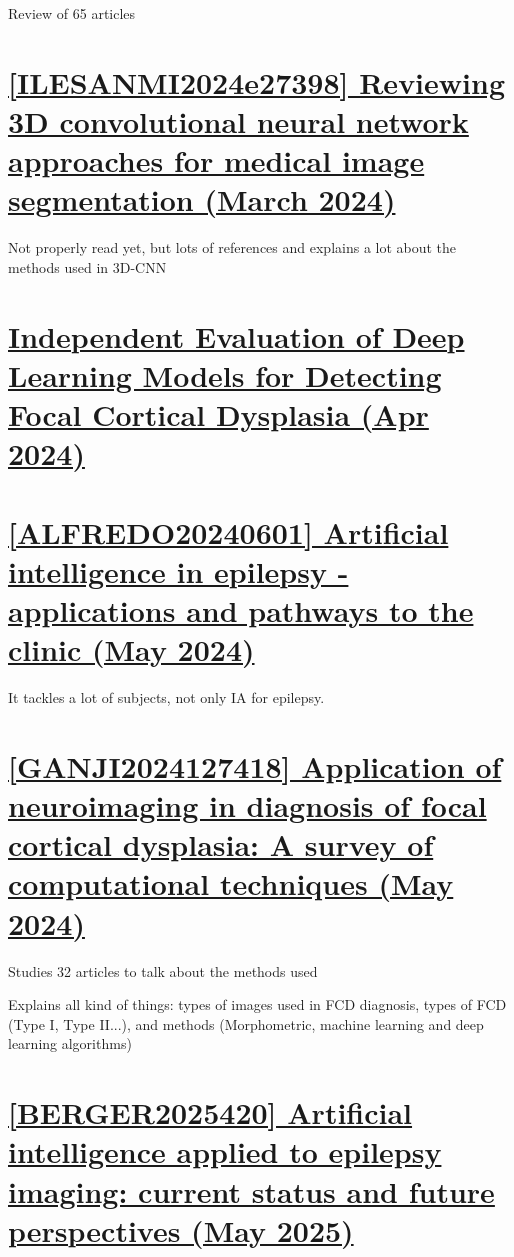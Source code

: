 Review of 65 articles

\section{\href{https://www.sciencedirect.com/science/article/pii/S2405844024034297}{[ILESANMI2024e27398] Reviewing 3D convolutional neural network approaches for medical image segmentation (March 2024)}}

Not properly read yet, but lots of references and explains a lot about the methods used in 3D-CNN

\section{\href{https://www.medrxiv.org/content/10.1101/2025.04.06.25325315v1.full}{Independent Evaluation of Deep Learning Models for Detecting Focal Cortical Dysplasia (Apr 2024)}}

\section{\href{https://www.nature.com/articles/s41582-024-00965-9}{[ALFREDO20240601] Artificial intelligence in epilepsy - applications and pathways to the clinic (May 2024) }}

It tackles a lot of subjects, not only IA for epilepsy.

\section{\href{https://www.sciencedirect.com/science/article/pii/S0925231224001899}{[GANJI2024127418] Application of neuroimaging in diagnosis of focal cortical dysplasia: A survey of computational techniques (May 2024)}}

Studies 32 articles to talk about the methods used

Explains all kind of things: types of images used in FCD diagnosis, types of FCD (Type I, Type II...), and methods (Morphometric, machine learning and deep learning algorithms)

\section{\href{https://www.sciencedirect.com/science/article/pii/S0035378725004874}{[BERGER2025420] Artificial intelligence applied to epilepsy imaging: current status and future perspectives (May 2025) }}

